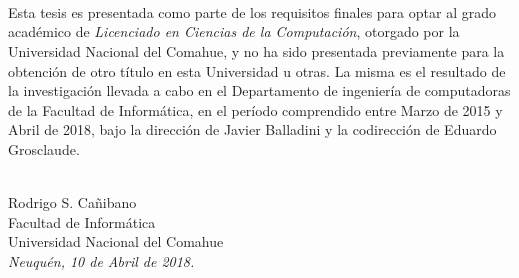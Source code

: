 \ \\
\ \\
\label{pagpref}
\\
\ \\
\ \\

\ \\

\ \\
\ \\


Esta tesis es presentada como parte de los requisitos finales para optar al
grado académico de {\em Licenciado en Ciencias de la Computación}, otorgado por
la Universidad Nacional del Comahue, y no ha sido presentada previamente para la
obtención de otro título en esta Universidad u otras. La misma es el resultado
de la investigación llevada a cabo en el Departamento de ingeniería de
computadoras de la Facultad de Informática, en el período comprendido entre
Marzo de 2015 y Abril de 2018, bajo la dirección de Javier Balladini y la
codirección de Eduardo Grosclaude.

\vspace{3cm}


\ \\
{\flushright Rodrigo S. Cañibano\\
{\sc Facultad de Informática \\
Universidad Nacional del Comahue}\\
{\em Neuquén, 10 de Abril de 2018.}\\}

\vfill

\begin{center}
%
\end{center}

\pagebreak
